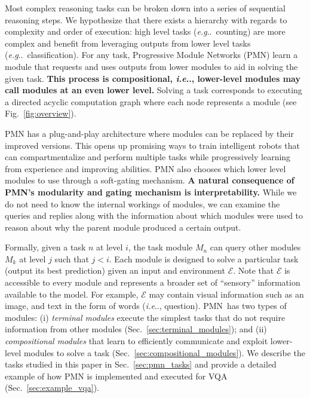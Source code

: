\documentclass{article}
\makeatletter
\newcommand{\SK}[1]{{\color{NavyBlue}{[@Seung: #1]}}}
\def\PMN{PMN}
\def\E{\mathcal{E}}
\DeclareRobustCommand\onedot{\futurelet\@let@token\@onedot}
\def\@onedot{\ifx\@let@token.\else.\null\fi\xspace}
\def\eg{\emph{e.g}\onedot} \def\Eg{\emph{E.g}\onedot}
\def\ie{\emph{i.e}\onedot} \def\Ie{\emph{I.e}\onedot}
\makeatother
\begin{document}
Most complex reasoning tasks can be broken down into a series of sequential reasoning steps.
We hypothesize that there exists a hierarchy with regards to complexity and order of execution:
high level tasks (\eg~counting) are more complex and benefit from leveraging outputs from lower level tasks (\eg~classification).
For any task, Progressive Module Networks (\PMN) learn a module that requests and uses outputs from lower modules to aid in solving the given task.
\textbf{This process is compositional, \ie, lower-level modules may call modules at an even lower level.}%
Solving a task corresponds to executing a directed acyclic computation graph where each node represents a module (see Fig.~\ref{fig:overview}).

PMN has a plug-and-play architecture where modules can be replaced by their improved versions.
This opens up promising ways to train intelligent robots that can compartmentalize and perform multiple tasks while progressively learning from experience and improving abilities.
PMN also chooses %
which lower level modules to use through a soft-gating mechanism.
\textbf{A natural consequence of PMN's modularity and gating mechanism is interpretability.}
While we do not need to know the internal workings of modules, we can examine the queries and replies along with the information about which modules were used to reason about why the parent module produced a certain output.


Formally, given a task $n$ at level $i$, the task module $M_n$ can query other modules $M_k$ at level $j$ such that $j < i$.
Each module is designed to solve a particular task (output its best prediction) given an input and environment $\E$.
Note that $\E$ is accessible to every module and represents a broader set of ``sensory'' information available to the model.
For example, $\E$ may contain visual information such as an image, and text in the form of words (\ie, question).
\PMN~has two types of modules:
(i) \emph{terminal modules} execute the simplest tasks that do not require information from other modules (Sec.~\ref{sec:terminal_modules}); and
(ii) \emph{compositional modules} that learn to efficiently communicate and exploit lower-level modules to solve a task (Sec.~\ref{sec:compositional_modules}).
We describe the tasks studied in this paper in Sec.~\ref{sec:pmn_tasks} and provide a detailed example of how PMN is implemented and executed for VQA (Sec.~\ref{sec:example_vqa}).
\end{document}

